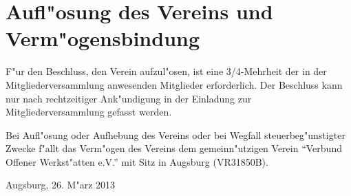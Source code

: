 \documentclass[a5paper, ngerman, 10pt]{scrreprt}
\begin{document}
\section{Aufl"osung des Vereins und Verm"ogensbindung}
\begin{compactenum}[(1)]
    \item F"ur den Beschluss, den Verein aufzul"osen, ist eine 3/4-Mehrheit der
        in der Mitgliederversammlung anwesenden Mitglieder erforderlich. Der
        Beschluss kann nur nach rechtzeitiger Ank"undigung in der Einladung zur
        Mitgliederversammlung gefasst werden.
    \item Bei Aufl"osung oder Aufhebung des Vereins oder bei Wegfall
        steuerbeg"unstigter Zwecke f"allt das Verm"ogen des Vereins dem
        gemeinn"utzigen Verein "`Verbund Offener Werkst"atten e.V."' mit Sitz in
        Augsburg (VR31850B).
\end{compactenum}

\vspace{\fill}
Augsburg, 26. M"arz 2013
\end{document}
